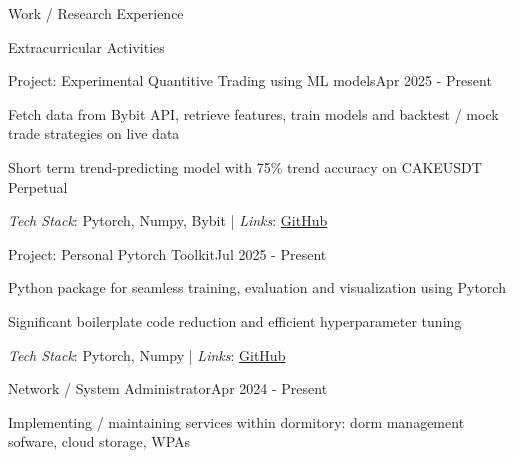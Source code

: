 \documentclass{kyvernitis-resume}
\begin{document}
\begin{section}{Work / Research Experience}
    

  
\end{section}
\begin{section}{Extracurricular Activities}
     
    \begin{subsectionnosl}{Project: Experimental Quantitive Trading using ML models}{Apr 2025 - Present}
     \item{Fetch data from Bybit API, retrieve features, train models and backtest / mock trade strategies on live data}
     \item{Short term trend-predicting model with 75\% trend accuracy on CAKEUSDT Perpetual}
     \end{subsectionnosl}
    \textit{Tech Stack}: Pytorch, Numpy, Bybit\hspace{0.1cm} | \hspace{0.1cm}
    \textit{Links}: \href{https://github.com/noahpy/my_ml_crypto_trading}{GitHub}

    \begin{subsectionnosl}{Project: Personal Pytorch Toolkit}{Jul 2025 - Present}
     \item{Python package for seamless training, evaluation and visualization using Pytorch}
     \item{Significant boilerplate code reduction and efficient hyperparameter tuning}
     \end{subsectionnosl}
    \textit{Tech Stack}: Pytorch, Numpy \hspace{0.1cm} | \hspace{0.1cm}
    \textit{Links}: \href{https://github.com/noahpy/my_pytorch_kit}{GitHub}

     \begin{subsectionnosl}{Network / System Administrator}{Apr 2024 - Present}
     \item{Implementing / maintaining services within dormitory: dorm management sofware, cloud storage, WPAs}
     \end{subsectionnosl}
    



\end{section}
\end{document}
